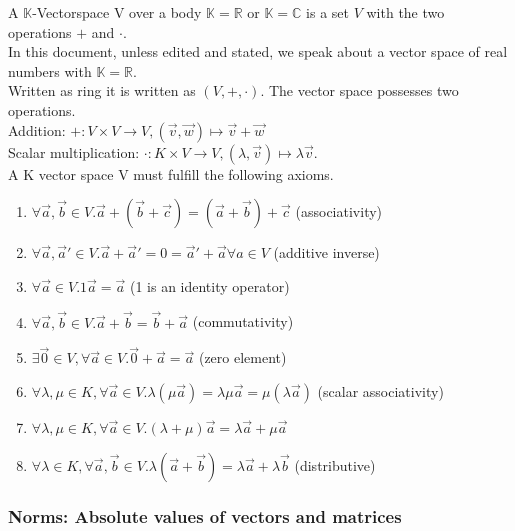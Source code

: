 \documentclass[a4paper]{article}
\begin{document}
A $\mathbb{K}$-Vectorspace V over a body $\mathbb{K} = \mathbb{R}$ or $\mathbb{K} = \mathbb{C}$ is a set $V$ with the two operations $+$ and $\cdot$.\\

In this document, unless edited and stated, we speak about a vector space of real numbers with $\mathbb{K} = \mathbb{R}$.\\

Written as ring it is written as $(V, +, \cdot)$. The vector space possesses two operations.\\

Addition: $+: V \times V \rightarrow V, (\vec{v},\vec{w}) \mapsto \vec{v}+\vec{w}$\\
Scalar multiplication: $\cdot: K \times V \rightarrow V, (\lambda, \vec{v}) \mapsto \lambda\vec{v}$.\\

A K vector space V must fulfill the following axioms.\\

\begin{enumerate}
\label{kvs_axioms}
\item $\forall \vec{a},\vec{b} \in V. \vec{a}+(\vec{b}+\vec{c}) = (\vec{a}+\vec{b})+\vec{c}$ (associativity)
\item $\forall \vec{a},\vec{a}' \in V. \vec{a} + \vec{a}' = 0 = \vec{a}' + \vec{a} \forall a \in V$ (additive inverse)
\item $\forall \vec{a} \in V. 1\vec{a} = \vec{a}$    (1 is an identity operator)
\item $\forall \vec{a},\vec{b} \in V.  \vec{a}+\vec{b}=\vec{b}+\vec{a}$ (commutativity)
\item $\exists \vec{0} \in V,\forall \vec{a} \in V. \vec{0}+\vec{a}=\vec{a}$ (zero element)
\item $\forall \lambda,\mu \in K, \forall \vec{a} \in V. \lambda(\mu\vec{a})=\lambda\mu\vec{a}=\mu(\lambda\vec{a})$ (scalar associativity)
\item $\forall \lambda,\mu \in K, \forall \vec{a} \in V. (\lambda + \mu)\vec{a} = \lambda\vec{a}+\mu\vec{a}$
\item $\forall \lambda \in K, \forall \vec{a}, \vec{b} \in V. \lambda(\vec{a}+\vec{b}) = \lambda\vec{a}+\lambda\vec{b}$  (distributive)
\end{enumerate}

\subsubsection{Norms: Absolute values of vectors and matrices}
\end{document}
